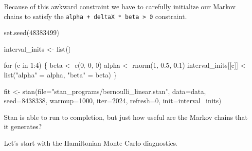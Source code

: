 \documentclass[
  letterpaper,
  DIV=11,
  numbers=noendperiod]{scrartcl}
\newenvironment{Shaded}{\begin{snugshade}}{\end{snugshade}}
\newcommand{\AttributeTok}[1]{\textcolor[rgb]{0.40,0.45,0.13}{#1}}
\newcommand{\ControlFlowTok}[1]{\textcolor[rgb]{0.00,0.23,0.31}{#1}}
\newcommand{\DecValTok}[1]{\textcolor[rgb]{0.68,0.00,0.00}{#1}}
\newcommand{\FloatTok}[1]{\textcolor[rgb]{0.68,0.00,0.00}{#1}}
\newcommand{\FunctionTok}[1]{\textcolor[rgb]{0.28,0.35,0.67}{#1}}
\newcommand{\NormalTok}[1]{\textcolor[rgb]{0.00,0.23,0.31}{#1}}
\newcommand{\OtherTok}[1]{\textcolor[rgb]{0.00,0.23,0.31}{#1}}
\newcommand{\SpecialCharTok}[1]{\textcolor[rgb]{0.37,0.37,0.37}{#1}}
\newcommand{\StringTok}[1]{\textcolor[rgb]{0.13,0.47,0.30}{#1}}
\begin{document}
Because of this awkward constraint we have to carefully initialize our
Markov chains to satisfy the
\texttt{alpha\ +\ deltaX\ *\ beta\ \textgreater{}\ 0} constraint.

\begin{Shaded}
\begin{Highlighting}[]
\FunctionTok{set.seed}\NormalTok{(}\DecValTok{48383499}\NormalTok{)}

\NormalTok{interval\_inits }\OtherTok{\textless{}{-}} \FunctionTok{list}\NormalTok{()}

\ControlFlowTok{for}\NormalTok{ (c }\ControlFlowTok{in} \DecValTok{1}\SpecialCharTok{:}\DecValTok{4}\NormalTok{) \{}
\NormalTok{  beta }\OtherTok{\textless{}{-}} \FunctionTok{c}\NormalTok{(}\DecValTok{0}\NormalTok{, }\DecValTok{0}\NormalTok{, }\DecValTok{0}\NormalTok{)}
\NormalTok{  alpha }\OtherTok{\textless{}{-}} \FunctionTok{rnorm}\NormalTok{(}\DecValTok{1}\NormalTok{, }\FloatTok{0.5}\NormalTok{, }\FloatTok{0.1}\NormalTok{)}
\NormalTok{  interval\_inits[[c]] }\OtherTok{\textless{}{-}} \FunctionTok{list}\NormalTok{(}\StringTok{"alpha"} \OtherTok{=}\NormalTok{ alpha, }\StringTok{"beta"} \OtherTok{=}\NormalTok{ beta)}
\NormalTok{\}}

\NormalTok{fit }\OtherTok{\textless{}{-}} \FunctionTok{stan}\NormalTok{(}\AttributeTok{file=}\StringTok{"stan\_programs/bernoulli\_linear.stan"}\NormalTok{,}
            \AttributeTok{data=}\NormalTok{data, }\AttributeTok{seed=}\DecValTok{8438338}\NormalTok{,}
            \AttributeTok{warmup=}\DecValTok{1000}\NormalTok{, }\AttributeTok{iter=}\DecValTok{2024}\NormalTok{, }\AttributeTok{refresh=}\DecValTok{0}\NormalTok{,}
            \AttributeTok{init=}\NormalTok{interval\_inits)}
\end{Highlighting}
\end{Shaded}

Stan is able to run to completion, but just how useful are the Markov
chains that it generates?

Let's start with the Hamiltonian Monte Carlo diagnostics.

\begin{Shaded}
\end{Shaded}
\end{document}

